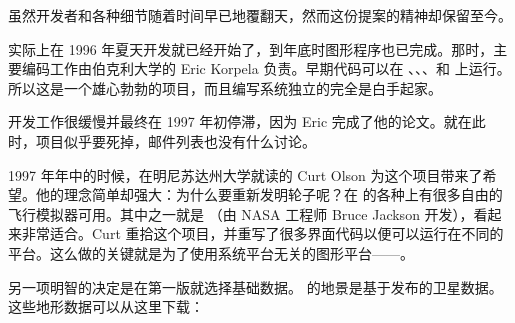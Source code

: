 \noindent
\ifchinese
虽然开发者和各种细节随着时间早已地覆翻天，然而这份提案的精神却保留至今。

实际上在 1996 年夏天开发就已经开始了，到年底时图形程序也已完成。那时，主要编码工作由伯克利大学的 Eric Korpela 负责。早期代码可以在 、、、和  上运行。所以这是一个雄心勃勃的项目，而且编写系统独立的完全是白手起家。

开发工作很缓慢并最终在 1997 年初停滞，因为 Eric 完成了他的论文。就在此时，项目似乎要死掉，邮件列表也没有什么讨论。

1997 年年中的时候，在明尼苏达州大学就读的 Curt Olson 为这个项目带来了希望。他的理念简单却强大：为什么要重新发明轮子呢？在  的各种上有很多自由的飞行模拟器可用。其中之一就是 （由 NASA 工程师 Bruce Jackson 开发），看起来非常适合。Curt 重拾这个项目，并重写了很多界面代码以便可以运行在不同的平台。这么做的关键就是为了使用系统平台无关的图形平台——。

另一项明智的决定是在第一版就选择基础数据。\FlightGear{} 的地景是基于发布的卫星数据。这些地形数据可以从这里下载：

